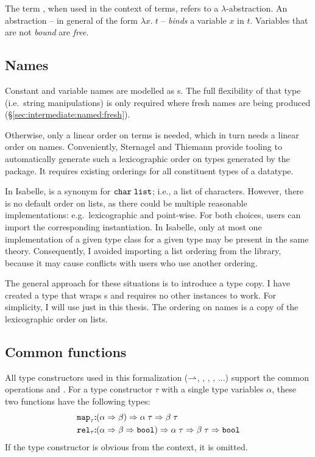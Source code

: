 The term , when used in the context of terms, refers to a $\lambda$-abstraction.
An abstraction -- in general of the form $\lambda x.\;t$ -- \emph{binds} a variable $x$ in $t$.
Variables that are not \emph{bound} are \emph{free}.

\subsection{Names}
Constant and variable names are modelled as s.
The full flexibility of that type (i.e.\ string manipulations) is only required where fresh names are being produced (§\ref{sec:intermediate:named:fresh}).

Otherwise, only a linear order on terms is needed, which in turn needs a linear order on names.
Conveniently, Sternagel and Thiemann \cite{sternagel2015deriving} provide tooling to automatically generate such a lexicographic order on types generated by the  package.
It requires existing orderings for all constituent types of a datatype.

In Isabelle,  is a synonym for $\texttt{\textup{char}}\;\texttt{\textup{list}}$; i.e., a list of characters.
However, there is no default order on lists, as there could be multiple reasonable implementations: e.g.\ lexicographic and point-wise.
For both choices, users can import the corresponding instantiation.
In Isabelle, only at most one implementation of a given type class for a given type may be present in the same theory.
Consequently, I avoided importing a list ordering from the library, because it may cause conflicts with users who use another ordering.

The general approach for these situations is to introduce a type copy.
I have created a  type that wraps s and requires no other instances to work.
For simplicity, I will use just  in this thesis.
The ordering on names is a copy of the lexicographic order on lists.

\subsection{Common functions}
All type constructors used in this formalization ($\mathbin{\rightharpoonup}$, , , , ...) support the common operations  and .
For a type constructor $\tau$ with a single type variables $\alpha$, these two functions have the following types:
%
\begin{align*}
  \texttt{\textup{map}}_\tau \mathbin{:\!\!:} &(\alpha \Rightarrow \beta) \Rightarrow \alpha\;\tau \Rightarrow \beta\;\tau \\
  \texttt{\textup{rel}}_\tau \mathbin{:\!\!:} &(\alpha \Rightarrow \beta \Rightarrow \texttt{\textup{bool}}) \Rightarrow \alpha\;\tau \Rightarrow  \beta\;\tau \Rightarrow \texttt{\textup{bool}}\\
\end{align*}
%
If the type constructor is obvious from the context, it is omitted.

